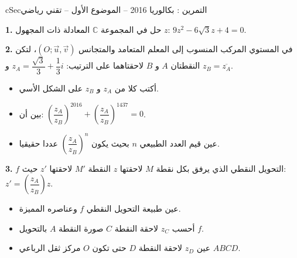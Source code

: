 \documentclass[12pt,a4paper]{article}
\newenvironment{BOX}[2]{\begin{otherlanguage}{english}\begin{arbox}{#1}{#2}}{\end{arbox}\end{otherlanguage}}
\newcounter{exo}
\newenvironment{tamrin}[1]{\stepcounter{exo}\begin{BOX}{cSec}{التمرين \theexo: #1}}{\end{BOX}}
\newenvironment{sq}{\begin{itemize}[leftmargin=2.4em,itemsep=3pt]}{\end{itemize}}
\newcommand{\qa}{\item[(أ)]}\newcommand{\qb}{\item[(ب)]}\newcommand{\qc}{\item[(جـ)]}\newcommand{\qd}{\item[(د)]}\newcommand{\qe}{\item[(هـ)]}
\newcommand{\QQ}[1]{\par\smallskip\textbf{#1.} }
\begin{document}
\begin{tamrin}{بكالوريا 2016 -- الموضوع الأول -- تقني رياضي}
\QQ{1} حل في المجموعة $\mathbb{C}$ المعادلة ذات المجهول $z$: $9z^2-6\sqrt3z+4=0$.

\QQ{2} في المستوي المركب المنسوب إلى المعلم المتعامد والمتجانس $(O;\vec u,\vec v)$، لتكن النقطتان $A$ و $B$ لاحقتاهما على الترتيب: $z_A=\dfrac{\sqrt3}{3}+\dfrac13i$ و $z_B=\overline{z_A}$.
\begin{sq}
\qa أكتب كلا من $z_A$ و $z_B$ على الشكل الأسي.
\qb بين أن: $\left(\dfrac{z_A}{z_B}\right)^{2016}+\left(\dfrac{z_A}{z_B}\right)^{1437}=0$.
\qc عين قيم العدد الطبيعي $n$ بحيث يكون $\left(\dfrac{z_A}{z_B}\right)^n$ عددا حقيقيا.
\end{sq}
\QQ{3} $f$ التحويل النقطي الذي يرفق بكل نقطة $M$ لاحقتها $z$ النقطة $M'$ لاحقتها $z'$ حيث: $z'=\left(\dfrac{z_A}{z_B}\right)z$.
\begin{sq}
\qa عين طبيعة التحويل النقطي $f$ وعناصره المميزة.
\qb أحسب $z_C$ لاحقة النقطة $C$ صورة النقطة $A$ بالتحويل $f$.
\qc عين $z_D$ لاحقة النقطة $D$ حتى تكون $O$ مركز ثقل الرباعي $ABCD$.
\end{sq}
\end{tamrin}
\end{document}
